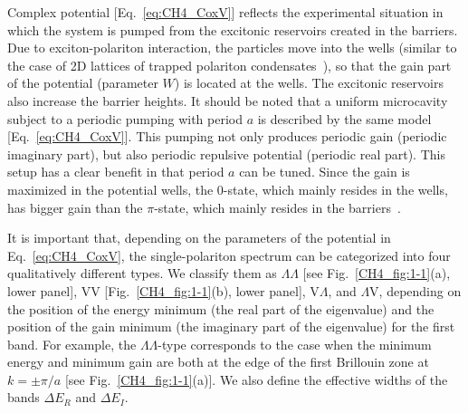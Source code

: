 Complex potential [Eq.~\eqref{eq:CH4_CoxV}] reflects the experimental situation in which the system is pumped from the excitonic reservoirs created in the barriers.
Due to exciton-polariton interaction, the particles move into the wells (similar to the case of 2D lattices of trapped polariton condensates~\cite{Ohadi:2017aa}), so that the gain part of the potential (parameter $W$) is located at the wells.
The excitonic reservoirs also increase the barrier heights.
It should be noted that a uniform microcavity subject to a periodic pumping with period $a$ is described by the same model [Eq.~\eqref{eq:CH4_CoxV}].
This pumping not only produces periodic gain (periodic imaginary part), but also periodic repulsive potential (periodic real part).
This setup has a clear benefit in that period $a$ can be tuned.
Since the gain is maximized in the potential wells, the $0$-state, which mainly resides in the wells, has bigger gain than the $\pi$-state, which mainly resides in the barriers~\cite{Lai:2007aa}.

It is important that, depending on the parameters of the potential in Eq.~\eqref{eq:CH4_CoxV}, the single-polariton spectrum can be categorized into four qualitatively different types.
We classify them as $\Lambda\Lambda$ [see Fig.~\ref{CH4_fig:1-1}(a), lower panel], VV [Fig.~\ref{CH4_fig:1-1}(b), lower panel], V$\Lambda$, and $\Lambda$V, depending on the position of the energy minimum (the real part of the eigenvalue) and the position of the gain minimum (the imaginary part of the eigenvalue) for the first band.
For example, the $\Lambda\Lambda$-type corresponds to the case when the minimum energy and minimum gain are both at the edge of the first Brillouin zone at $k=\pm \pi/a$ [see Fig.~\ref{CH4_fig:1-1}(a)].
We also define the effective widths of the bands $\Delta E_R$ and $\Delta E_I$.

